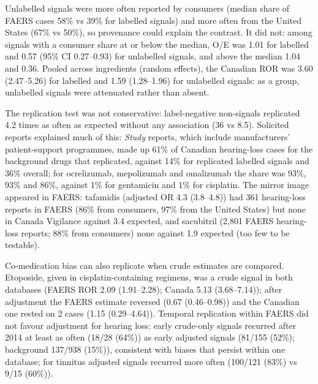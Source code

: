 Unlabelled signals were more often reported by consumers (median share of FAERS cases
58\% vs 39\% for labelled signals) and
more often from the United States (67\% vs 50\%), so
provenance could explain the contrast. It did not: among signals with a consumer share at or below the median, O/E was
1.01 for labelled and
0.57 (95\% CI
0.27--0.93) for
unlabelled signals, and above the median 1.04 and
0.36. Pooled across ingredients (random effects), the Canadian ROR
was 3.60 (2.47--5.26)
for labelled and 1.59 (1.28--1.96)
for unlabelled signals: as a group, unlabelled signals were attenuated rather than absent.

The replication test was not conservative: label-negative non-signals replicated 4.2 times as often as expected without any association
(36 vs 8.5). Solicited reports explained much of this:
\emph{Study} reports, which include manufacturers' patient-support programmes, made up 61\%
of Canadian hearing-loss cases for the background drugs that replicated, against 14\% for
replicated labelled signals and 36\% overall; for ocrelizumab, mepolizumab and omalizumab the share
was 93\%, 93\% and 86\%, against
1\% for gentamicin and 1\% for cisplatin. The mirror image appeared in FAERS:
tafamidis (adjusted OR 4.3 (3.8--4.8)) had
361 hearing-loss reports in FAERS (86\% from consumers,
97\% from the United States) but none in Canada Vigilance against 3.4 expected, and
sacubitril (2{,}801 FAERS hearing-loss reports; 88\% from consumers) none against
1.9 expected (too few to be testable).

Co-medication bias can also replicate when crude estimates are compared. Etoposide, given in cisplatin-containing regimens,
was a crude signal in both databases (FAERS ROR 2.09 (1.91--2.28);
Canada 5.13 (3.68--7.14)); after adjustment the FAERS estimate reversed
(0.67 (0.46--0.98)) and the Canadian one rested on
2 cases (1.15 (0.29--4.64)). Temporal replication within FAERS
did not favour adjustment for hearing loss: early crude-only signals recurred after 2014 at least as often
(18/28 (64\%)) as early adjusted signals (81/155 (52\%); background 137/938 (15\%)),
consistent with biases that persist within one database; for tinnitus adjusted signals recurred more often
(100/121 (83\%) vs 9/15 (60\%)).

